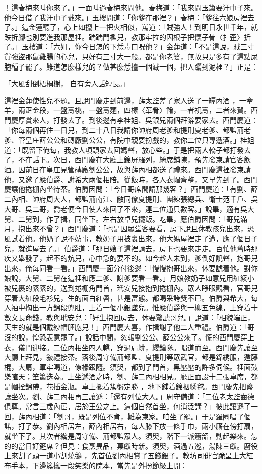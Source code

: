 ！這春梅來叫你來了。」一面叫過春梅來問他。春梅道：「我來問玉簫要汗巾子來。他今日借了我汗巾子戴來。」玉樓問道：「你爹在那裡？」春梅：「爹往六娘房裡去了。」這金蓮聽了，心上如攛上一把火相似，罵道：「賊強人！到明日永世千年，就跌折腳也別要進我那屋裡。踹踹門檻兒，教那牢拉的囚根子把懷子骨〈扌歪〉折了。」玉樓道：「六姐，你今日怎的下恁毒口呪他？」金蓮道：「不是這說，賊三寸貨強盜那鼠雞腸的心兒，只好有三寸大一般。都是你老婆，無故只是多有了這點尿胞種子罷了。難道怎麼樣兒的？做甚麼恁擡一個滅一個，把人躧到泥裡？」正是：

「大風刮倒梧桐樹，  自有旁人話短長。」

這裡金蓮使性兒不題。且說門慶走到前邊，薛太監差了家人送了一罈內酒 ，一牽羊，兩疋金段，一盤壽桃，一盤壽麵，四樣〈革肴〉餚，一者祝壽，二者來賀。西門慶厚賞來人，打發去了。到後邊有李桂姐、吳銀兒兩個拜辭要家去。西門慶道：「你每兩個再住一日兒，到二十八日我請你帥府周老爹和提刑夏老爹、都監荊老爹、管皇庄薛公公和磚廠劉公公，有院中親耍扮戲的，教你二位只專遞酒。」桂姐道：「既留下俺每，我教人項頭家去回媽聲，放心些。」于是把兩人轎子都打發去了，不在話下。次日，西門慶在大廳上錦屏羅列，綺席鋪陳，預先發柬請官客飲酒。因前日在皇庄見管磚廠劉公公，故與薛內相都送了禮來。西門慶這裡發柬請他，又邀了應伯爵、謝希大兩個相陪。從飯時，各人衣帽齊整，又早先到了。西門慶讓他捲棚內坐待茶。伯爵因問：「今日哥席間請那幾客？」西門慶道：「有劉、薛二內相、帥府周大人，都監荊南江、敝同僚夏提刑、團練張總兵、衛士范千戶、吳大哥、吳二哥，喬老便今日使人來回了不來，連二位通只數客。」說畢，適有吳大舅、二舅到，作了揖，同坐下。左右放卓兒擺飯。吃畢，應伯爵因問：「哥兒滿月，抱出來不曾？」西門慶道：「也是因眾堂客要看，房下說且休教孩兒出來，恐風試着他。他奶子說不妨事，教奶子用被裹出來，他大媽屋裡走了遭，應了個日子兒，就進屋去了。」伯爵道：「那日嫂子這裡請去，房下也要來走走。百忙他舊時那疾又舉發了，起不的炕兒，心中急的要不的。如今趁人未到，爹倒好說聲，抱哥兒出來，俺每同看一看。」西門慶一面分付後邊：「慢慢抱哥出來，休要諕着他。對你娘說，大舅、二舅在這裡和應二爹、謝爹要看一看。」月娘教奶子如意兒用紅綾小被兒裹的緊緊的，送到捲棚角門首，玳安兒接抱到捲棚內。眾人睜眼觀看，官哥兒穿着大紅段毛衫兒，生的面白紅唇，甚是富態。都喝采誇獎不已。伯爵與希大，每人袖中掏出一方錦段兜肚，上着一個小銀墜兒。惟應伯爵與一柳五色線，上穿着十數文長命錢，教與玳安兒：「好生抱回房去，休要驚諕哥兒。」說道：「相貌端正，天生的就是個戴紗帽胚胞兒！」西門慶大喜，作揖謝了他二人重禮。伯爵道：「哥沒的說，惶恐表意罷了。」說話中間，忽報劉公公、薛公公來了。慌的西門慶穿上衣，儀門迎接。二位內相坐四人轎，穿過肩蟒，纓鎗隊。喝道而至。西門慶先讓至大廳上拜見，敍禮接茶。落後周守備荊都監、夏提刑等眾武官，都是錦綉服，遁藤棍，大扇，軍牢喝道，僚椽跟隨。須臾，都到了門首，黑壓壓的許多伺候。裡面鼓樂喧天；笙簫迭奏。上坐遞酒之時，劉、薛二內相相見。廳正面設十二張卓席，都是幗拴錦帶，花插金瓶。卓上擺着簇盤定勝 ，地下鋪着錦裀綉毬。西門慶先把盞讓坐次。劉、薛二內相再三讓遜：「還有列位大人。」周守備道：「二位老太監齒德俱尊。常言三歲內宦，居於王公之上。這個自然首坐，何消泛講？」彼此讓遜了一回，薛內相道：「劉哥，既是列位不肯，難為柬家。咱坐了罷。」于是羅圈唱了個諾，打了恭。劉內相居左，薛內相居右，每人膝下放一條手巾，兩小廝在傍打扇，就坐下了。其次者纔是周守備、荊都監眾人。須臾，階下一派簫韶，動起樂來。怎的的當日好筵席？但見：食烹異品，菓獻時新。須臾，酒過五巡，湯陳三獻。廚役上來割了頭一道小割燒鵝 ，先首位劉內相賞了五錢銀子。教坊司俳官跪呈上大紅布手本，下邊簇擁一段笑樂的院本，當先是外扮節級上開：

